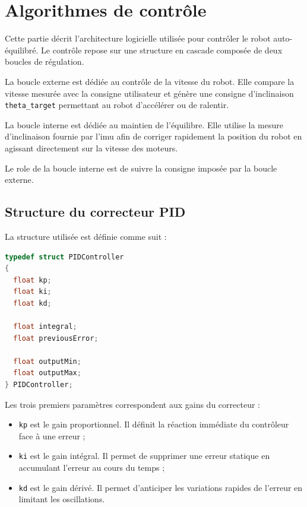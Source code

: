 \section{Algorithmes de contrôle}


Cette partie décrit l'architecture logicielle utilisée pour contrôler le robot auto-équilibré. Le contrôle repose sur une structure en cascade composée de deux boucles de régulation.

La boucle externe est dédiée au contrôle de la vitesse du robot. Elle compare la vitesse mesurée avec la consigne utilisateur et génère une consigne d'inclinaison \texttt{theta\_target} permettant au robot d'accélérer ou de ralentir.

La boucle interne est dédiée au maintien de l'équilibre. Elle utilise la mesure d'inclinaison fournie par l'\acrshort{imu} afin de corriger rapidement la position du robot en agissant directement sur la vitesse des moteurs.

Le role de la boucle interne est de suivre la consigne imposée par la boucle externe.

\subsection{Structure du correcteur PID}

La structure utilisée est définie comme suit :

\begin{lstlisting}[language=C++, caption={Structure de données d'un contrôleur PID}, label={lst:pid_structure}]
typedef struct PIDController
{
  float kp;
  float ki;
  float kd;

  float integral;
  float previousError;

  float outputMin;
  float outputMax;
} PIDController;
\end{lstlisting}

Les trois premiers paramètres correspondent aux gains du correcteur :
\begin{itemize}
    \item \texttt{kp} est le gain proportionnel. Il définit la réaction immédiate du contrôleur face à une erreur ;
    \item \texttt{ki} est le gain intégral. Il permet de supprimer une erreur statique en accumulant l'erreur au cours du temps ;
    \item \texttt{kd} est le gain dérivé. Il permet d'anticiper les variations rapides de l'erreur en limitant les oscillations.
\end{itemize}

